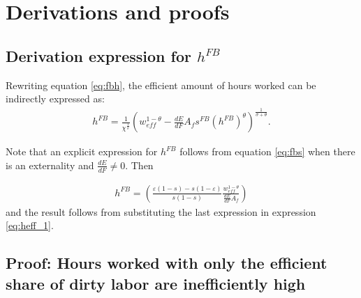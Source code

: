 \section{Derivations and proofs}\label{app:derivations}
\subsection{Derivation expression for $h^{FB}$}
Rewriting equation \ref{eq:fbh}, the efficient amount of hours worked can be indirectly expressed as:
\begin{align}
h^{FB}=\frac{1}{\chi^\frac{1}{\sigma}}\left(w_{eff}^{1-\theta}-\frac{dE}{dF}A_f s^{FB}\left(h^{FB}\right)^\theta \right)^\frac{1}{\sigma+\theta}.\label{eq:heff_1}
\end{align}

Note that an explicit expression for $h^{FB}$ follows from equation \ref{eq:fbs} when there is an externality and $\frac{dE}{dF}\neq 0$. Then 

\begin{align}
h^{FB}= \left(\frac{\varepsilon(1-s)-s(1-\varepsilon)}{s(1-s)}\frac{w_{eff}^{1-\theta}}{\frac{dE}{dF}A_f }\right)
\end{align}
and the result follows from substituting the last expression in expression  \ref{eq:heff_1}.

\subsection{Proof: Hours worked with only the efficient share of dirty labor are inefficiently high}

